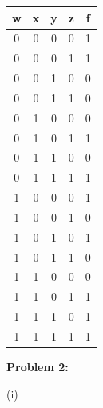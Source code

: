 \documentclass{article}
\begin{document}
    \begin{center}
        \begin{tabular} {cccc|c}
            w & x & y & z & f \\
            \hline
            0 & 0 & 0 & 0 & 1 \\
            0 & 0 & 0 & 1 & 1 \\
            0 & 0 & 1 & 0 & 0 \\
            0 & 0 & 1 & 1 & 0 \\
            0 & 1 & 0 & 0 & 0 \\
            0 & 1 & 0 & 1 & 1 \\
            0 & 1 & 1 & 0 & 0 \\
            0 & 1 & 1 & 1 & 1 \\
            1 & 0 & 0 & 0 & 1 \\
            1 & 0 & 0 & 1 & 0 \\
            1 & 0 & 1 & 0 & 1 \\
            1 & 0 & 1 & 1 & 0 \\
            1 & 1 & 0 & 0 & 0 \\
            1 & 1 & 0 & 1 & 1 \\
            1 & 1 & 1 & 0 & 1 \\
            1 & 1 & 1 & 1 & 1 \\
        \end{tabular}
    \end{center}



    \textbf{Problem 2:}

    \quad\quad (i)
\end{document}
